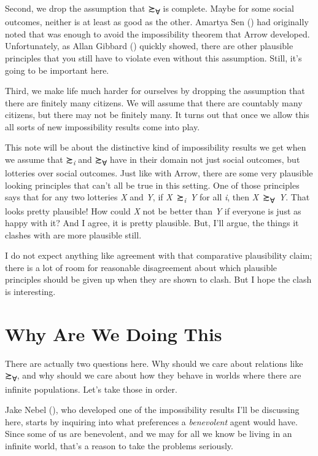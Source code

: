 \documentclass[
  11pt,
  letterpaper,
  DIV=11,
  numbers=noendperiod,
  twoside]{scrartcl}
\begin{document}
Second, we drop the assumption that ≿\textsubscript{∀} is complete.
Maybe for some social outcomes, neither is at least as good as the
other. Amartya Sen () had
originally noted that was enough to avoid the impossibility theorem that
Arrow developed. Unfortunately, as Allan Gibbard
() quickly showed, there are other
plausible principles that you still have to violate even without this
assumption. Still, it's going to be important here.

Third, we make life much harder for ourselves by dropping the assumption
that there are finitely many citizens. We will assume that there are
countably many citizens, but there may not be finitely many. It turns
out that once we allow this all sorts of new impossibility results come
into play.

This note will be about the distinctive kind of impossibility results we
get when we assume that ≿\textsubscript{\emph{i}} and ≿\textsubscript{∀}
have in their domain not just social outcomes, but lotteries over social
outcomes. Just like with Arrow, there are some very plausible looking
principles that can't all be true in this setting. One of those
principles says that for any two lotteries \emph{X} and \emph{Y}, if
\emph{X}~≿\textsubscript{\emph{i}}~\emph{Y} for all \emph{i}, then
\emph{X}~≿\textsubscript{∀}~\emph{Y}. That looks pretty plausible! How
could \emph{X} not be better than \emph{Y} if everyone is just as happy
with it? And I agree, it is pretty plausible. But, I'll argue, the
things it clashes with are more plausible still.

I do not expect anything like agreement with that comparative
plausibility claim; there is a lot of room for reasonable disagreement
about which plausible principles should be given up when they are shown
to clash. But I hope the clash is interesting.

\section{Why Are We Doing This}\label{sec-why}

There are actually two questions here. Why should we care about
relations like ≿\textsubscript{∀}, and why should we care about how they
behave in worlds where there are infinite populations. Let's take those
in order.

Jake Nebel (), who developed one of the
impossibility results I'll be discussing here, starts by inquiring into
what preferences a \emph{benevolent} agent would have. Since some of us
are benevolent, and we may for all we know be living in an infinite
world, that's a reason to take the problems seriously.
\end{document}
